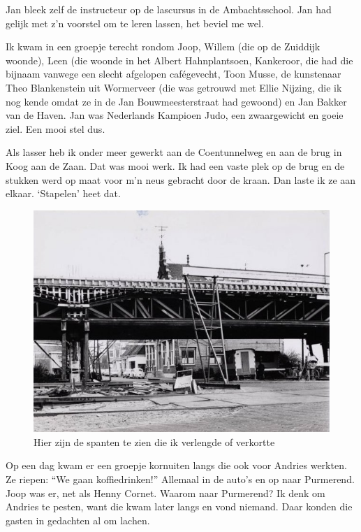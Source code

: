 \documentclass[12pt,twoside, openright]{memoir}
\begin{document}
Jan bleek zelf de instructeur op de lascursus in de Ambachtsschool. Jan had gelijk met z’n voorstel om te leren lassen, het beviel me wel.

Ik kwam in een groepje terecht rondom Joop, Willem (die op de Zuiddijk woonde), Leen (die woonde in het Albert Hahnplantsoen, Kankeroor, die had die bijnaam vanwege een slecht afgelopen cafégevecht, Toon Musse, de kunstenaar Theo Blankenstein uit Wormerveer (die was  getrouwd met Ellie Nijzing, die ik nog kende omdat ze in de Jan Bouwmeesterstraat had gewoond) en Jan Bakker van de Haven. Jan was Nederlands Kampioen Judo, een zwaargewicht en goeie ziel. Een mooi stel dus.

Als lasser heb ik onder meer gewerkt aan de Coentunnelweg en aan de brug in Koog aan de Zaan. Dat was mooi werk. Ik had een vaste plek op de brug en de stukken werd op maat voor m’n neus gebracht door de kraan. Dan laste ik ze aan elkaar. `Stapelen' heet dat.

\begin{figure}
\centering
\includegraphics[width=\textwidth]{img/220coentunnelweg}
\caption*{\footnotesize Hier zijn de spanten te zien die ik verlengde of verkortte}
\end{figure}

 Op een dag kwam er een groepje kornuiten langs die ook voor Andries werkten. Ze riepen: ``We gaan koffiedrinken!'' Allemaal in de auto’s en op naar Purmerend. Joop was er, net als Henny Cornet. Waarom naar Purmerend? Ik denk om Andries te pesten, want die kwam later langs en vond niemand. Daar konden die gasten in gedachten al om lachen.
\end{document}
